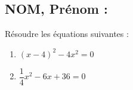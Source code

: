 \documentclass[a4paper,11pt,exos]{nsi}
\begin{document}
\subsection*{NOM, Prénom : \dotfill} 


\maketitle




\begin{exercice}
    Résoudre les équations suivantes :
    \begin{multicols}{2}
        \begin{enumerate}
            \item $(x-4)^2-4x^2=0$
	        \item $\dfrac{1}{4}x^2-6x+36=0$
        \end{enumerate}
    \end{multicols}
    
\end{exercice}

\end{document}
